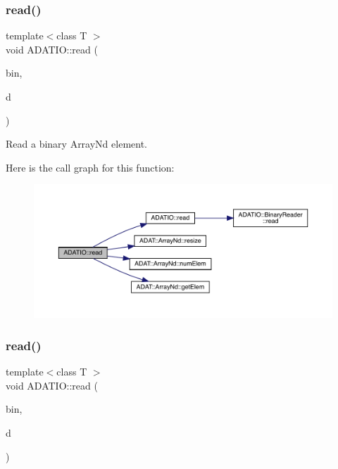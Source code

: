 \subsubsection{\texorpdfstring{read()}{read()}\hspace{0.1cm}{\footnotesize\ttfamily [23/28]}}
{\footnotesize\ttfamily template$<$class T $>$ \\
void A\+D\+A\+T\+I\+O\+::read (\begin{DoxyParamCaption}\item[{\mbox{\hyperlink{classADATIO_1_1BinaryReader}{Binary\+Reader}} \&}]{bin,  }\item[{\mbox{\hyperlink{classADAT_1_1ArrayNd}{A\+D\+A\+T\+::\+Array\+Nd}}$<$ T $>$ \&}]{d }\end{DoxyParamCaption})\hspace{0.3cm}{\ttfamily [inline]}}



Read a binary Array\+Nd element. 

Here is the call graph for this function\+:\nopagebreak
\begin{figure}[H]
\begin{center}
\leavevmode
\includegraphics[width=350pt]{d0/dba/namespaceADATIO_a0b5c3397d644a4f522e7b097825986cb_cgraph}
\end{center}
\end{figure}
\mbox{\label{namespaceADATIO_a6f8814a83922a0b41bf9a25627b5dcfd}} 
\subsubsection{\texorpdfstring{read()}{read()}\hspace{0.1cm}{\footnotesize\ttfamily [24/28]}}
{\footnotesize\ttfamily template$<$class T $>$ \\
void A\+D\+A\+T\+I\+O\+::read (\begin{DoxyParamCaption}\item[{\mbox{\hyperlink{classADATIO_1_1BinaryReader}{Binary\+Reader}} \&}]{bin,  }\item[{std\+::vector$<$ T $>$ \&}]{d }\end{DoxyParamCaption})\hspace{0.3cm}{\ttfamily [inline]}}



